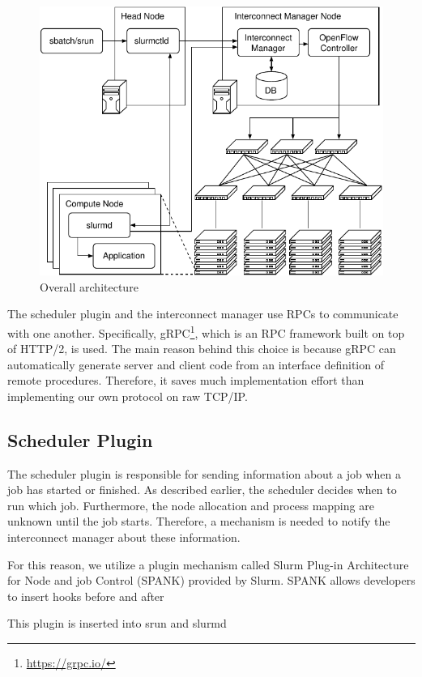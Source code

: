 \documentclass[graybox]{svmult}
\begin{document}
\begin{figure}
    \centering
    \includegraphics{architecture}
    \caption{Overall architecture}%
    \label{kt:fig:architecture}
\end{figure}

The scheduler plugin and the interconnect manager use RPCs to communicate with
one another. Specifically, gRPC\footnote{\url{https://grpc.io/}}, which is an
RPC framework built on top of HTTP/2, is used. The main reason behind this
choice is because gRPC can automatically generate server and client code from
an interface definition of remote procedures. Therefore, it saves much
implementation effort than implementing our own protocol on raw TCP/IP\@.

\subsection{Scheduler Plugin}

The scheduler plugin is responsible for sending information about a job when a
job has started or finished. As described earlier, the scheduler decides when
to run which job. Furthermore, the node allocation and process mapping are
unknown until the job starts. Therefore, a mechanism is needed to notify the
interconnect manager about these information.

For this reason, we utilize a plugin mechanism called Slurm Plug-in
Architecture for Node and job Control (SPANK) provided by Slurm. SPANK allows
developers to insert hooks before and after

This plugin is inserted into srun and slurmd
\end{document}
